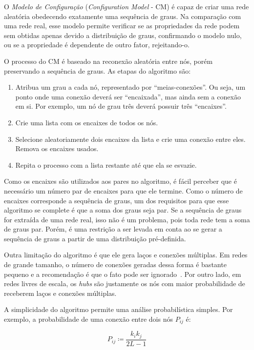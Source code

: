\documentclass[12pt,a4paper,final]{article}
\newcommand{\defn}{\coloneqq} %
\begin{document}
O \textit{Modelo de Configuração} (\textit{Configuration Model} - CM) é capaz de criar uma rede aleatória obedecendo exatamente uma sequência de graus. Na comparação com uma rede real, esse modelo permite verificar se as propriedades da rede podem sem obtidas apenas devido a distribuição de graus, confirmando o modelo nulo, ou se a propriedade é dependente de outro fator, rejeitando-o.

O processo do CM é baseado na reconexão aleatória entre nós, porém preservando a sequência de graus. As etapas do algoritmo são:

\begin{enumerate}
\item Atribua um grau a cada nó, representado por \enquote{meias-conexões}. Ou seja, um ponto onde uma conexão deverá ser \enquote{encaixada}, mas ainda sem a conexão em si. Por exemplo, um nó de grau três deverá possuir três \enquote{encaixes}.
\item Crie uma lista com os encaixes de todos os nós.
\item Selecione aleatoriamente dois encaixes da lista e crie uma conexão entre eles. Remova os encaixes usados.
\item Repita o processo com a lista restante até que ela se esvazie.
\end{enumerate}

Como os encaixes são utilizados aos pares no algoritmo, é fácil perceber que é necessário um número par de encaixes para que ele termine. Como o número de encaixes corresponde a sequência de graus, um dos requisitos para que esse algoritmo se complete é que a soma dos graus seja par. Se a sequência de graus for extraída de uma rede real, isso não é um problema, pois toda rede tem a soma de graus par. Porém, é uma restrição a ser levada em conta ao se gerar a sequência de graus a partir de uma distribuição pré-definida.

Outra limitação do algoritmo é que ele gera laços e conexões múltiplas. Em redes de grande tamanho, o número de conexões geradas dessa forma é bastante pequeno e a recomendação é que o fato pode ser ignorado~\cite{Barabasi2016-rn}. Por outro lado, em redes livres de escala, os \textit{hubs} são justamente os nós com maior probabilidade de receberem laços e conexões múltiplas.

A simplicidade do algoritmo permite uma análise probabilística simples. Por exemplo, a probabilidade de uma conexão entre dois nós $P_{ij}$ é:

\begin{equation} \label{eq:probabilidade-conexao}
P_{ij} \defn \frac{k_i k_j}{2L - 1}
\end{equation}
\end{document}
